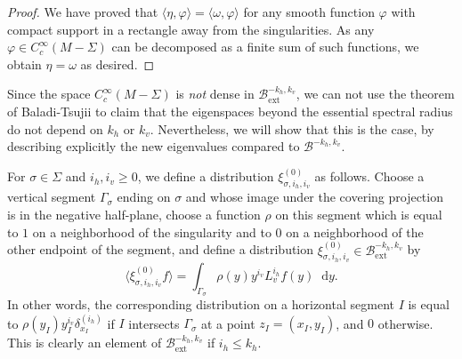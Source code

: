 \documentclass[10pt]{amsart}
\newcommand{\ext}{\mathrm{ext}}
\newcommand{\boB}{\mathcal{B}}
\newcommand{\dd}{\mathop{}\!\mathrm{d}}
\let\phi\varphi
\theoremstyle{definition}
\numberwithin{equation}{section}
\begin{document}
\begin{proof}
We have proved that $\langle \eta, \phi \rangle = \langle \omega, \phi
\rangle$ for any smooth function $\phi$ with compact support in a rectangle
away from the singularities. As any $\phi \in C^\infty_c(M-\Sigma)$ can be
decomposed as a finite sum of such functions, we obtain $\eta = \omega$ as
desired.
\end{proof}

Since the space $C^\infty_c(M-\Sigma)$ is \emph{not} dense in
$\boB^{-k_h,k_v}_{\ext}$, we can not use the theorem of Baladi-Tsujii to claim
that the eigenspaces beyond the essential spectral radius do not depend on
$k_h$ or $k_v$. Nevertheless, we will show that this is the case, by
describing explicitly the new eigenvalues compared to $\boB^{-k_h, k_v}$.

For $\sigma \in \Sigma$ and $i_h, i_v \geq 0$, we define a distribution
$\xi^{(0)}_{\sigma, i_h, i_v}$ as follows. Choose a vertical segment
$\Gamma_\sigma$ ending on $\sigma$ and whose image under the covering
projection is in the negative half-plane, choose a function $\rho$ on this
segment which is equal to $1$ on a neighborhood of the singularity and to $0$
on a neighborhood of the other endpoint of the segment, and define a
distribution $\xi^{(0)}_{\sigma, i_h, i_v} \in \boB_{\ext}^{-k_h, k_v}$ by
\[
\langle \xi^{(0)}_{\sigma, i_h, i_v} f\rangle = \int_{\Gamma_\sigma}
\rho(y)y^{i_v} L_v^{i_h} f(y)\dd y.
\]
In other words, the corresponding
distribution on a horizontal segment $I$ is equal to $\rho(y_I) y_I^{i_v}
\delta^{(i_h)}_{x_I}$ if $I$ intersects $\Gamma_\sigma$ at a point $z_I=(x_I,
y_I)$, and $0$ otherwise. This is clearly an element of $\boB_{\ext}^{-k_h,
k_v}$ if $i_h \leq k_h$.
\end{document}
